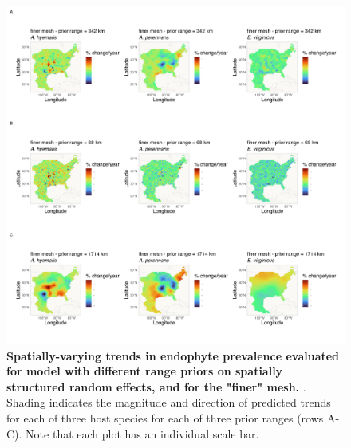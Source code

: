 \documentclass[11pt]{article}
\newcommand{\revise}[1]{{\color{black}{#1}}}
\begin{document}
\begin{figure}[H]
	\centering
	\includegraphics[width = .8\linewidth]{../Plots/finer_mesh_comparison_svc_plot.png}
	\caption[Spatially-varying trends in endophyte prevalence evaluated for the endophyte prevalence model with different range priors on spatially structured random effects, and for the "finer" mesh]{\textbf{Spatially-varying trends in endophyte prevalence evaluated for \revise{the endophyte prevalence} model with different range priors on spatially structured random effects, and for the "finer" mesh.} \revise{Data used in model fitting is the same across all panels and as in the main text}. Shading indicates the magnitude and direction of predicted trends for each of three host species for each of three prior ranges (rows A-C). Note that each plot has an individual scale bar.}
	\label{fig:finer_comparison_svc_plot}
\end{figure}
\newpage
\end{document}
